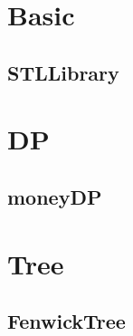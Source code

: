 \section{Basic}
\subsection{STLLibrary}


\section{DP}
\subsection{moneyDP}


\section{Tree}
\subsection{FenwickTree}

